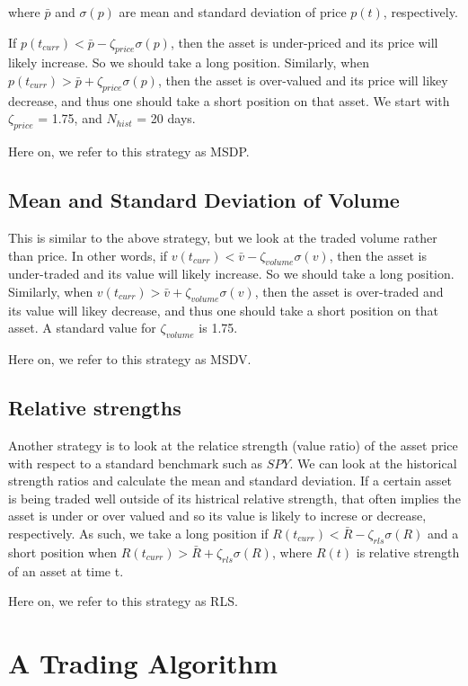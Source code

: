 \documentclass{article}
\begin{document}
where $\bar{p}$ and $\sigma(p)$ are mean and standard deviation of
price $p(t)$, respectively.

If $p(t_{curr}) < \bar{p} - \zeta_{price} \sigma(p)$, then the asset
is under-priced and its price will likely increase. So we should take
a long position. Similarly, when $p(t_{curr}) > \bar{p} +
\zeta_{price} \sigma(p)$, then the asset is over-valued and its price
will likey decrease, and thus one should take a short position on that
asset. We start with $\zeta_{price}$ = 1.75, and $N_{hist}$ = 20 days.

Here on, we refer to this strategy as MSDP.

\subsection{Mean and Standard Deviation of Volume}\label{section:msdv}

This is similar to the above strategy, but we look at the traded
volume rather than price. In other words, if $v(t_{curr}) < \bar{v} -
\zeta_{volume} \sigma(v)$, then the asset is under-traded and its
value will likely increase. So we should take a long
position. Similarly, when $v(t_{curr}) > \bar{v} + \zeta_{volume}
\sigma(v)$, then the asset is over-traded and its value will likey
decrease, and thus one should take a short position on that asset. A
standard value for $\zeta_{volume}$ is 1.75.

Here on, we refer to this strategy as MSDV.

\subsection{Relative strengths}\label{section:rls}

Another strategy is to look at the relatice strength (value ratio) of
the asset price with respect to a standard benchmark such as $SPY$. We
can look at the historical strength ratios and calculate the mean and
standard deviation. If a certain asset is being traded well outside of
its histrical relative strength, that often implies the asset is under
or over valued and so its value is likely to increse or decrease,
respectively. As such, we take a long position if $R(t_{curr}) <
\bar{R} - \zeta_{rls} \sigma(R)$ and a short position when
$R(t_{curr}) > \bar{R} + \zeta_{rls} \sigma(R)$, where $R(t)$ is
relative strength of an asset at time t.

Here on, we refer to this strategy as RLS.

\section{A Trading Algorithm}\label{section:algorithm}
\end{document}
